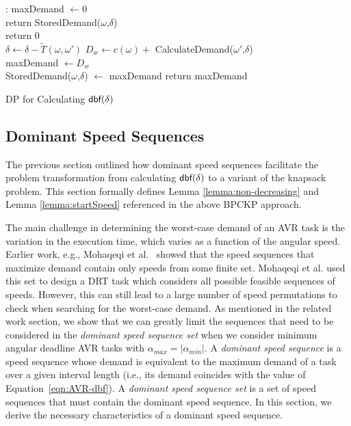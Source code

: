 \begin{algorithm}
\begin{algorithmic}[1]
:
\State maxDemand $\gets 0$
\\
\State return StoredDemand($\omega$,$\delta$)
\EndIf    
\\
\State return 0
\EndIf
\\
 
\State $\delta \gets \delta-\widetilde{T}(\omega,\omega')$
\State $D_w \gets c(\omega) +$ CalculateDemand($\omega'$,$\delta$)\\
\State maxDemand $\gets D_w$
\EndIf
\EndFor
\\
\State StoredDemand($\omega$,$\delta$) $\gets$ maxDemand
\State return maxDemand
\EndFunction
\end{algorithmic}
\caption{DP for Calculating $\mbox{\sf dbf}(\delta)$}
\label{algo}
\end{algorithm}

\subsection{Dominant Speed Sequences}
\label{sec:filterSeq}
The previous section outlined how dominant speed sequences facilitate the problem transformation from calculating $\mbox{\sf dbf}(\delta)$ to a variant of the knapsack problem.
This section formally defines Lemma \ref{lemma:non-decreasing} and Lemma \ref{lemma:startSpeed}
referenced in the above BPCKP approach.

The main challenge in determining the worst-case demand of an AVR task is the variation in the execution time, which varies as a function of the angular speed. 
Earlier work, e.g., Mohaqeqi et al.~\cite{mohaqeqi_refinement_2017} showed that the speed sequences that maximize demand contain only speeds from some finite set.
 Mohaqeqi et al. used this set to design a DRT task which considers all possible feasible sequences of speeds.
 However, this can still lead to a large number of speed permutations to check when searching for the worst-case demand.
 As mentioned in the related work section, we show that we can greatly limit the sequences that need to be considered in the \emph{dominant speed sequence set} when we consider minimum angular deadline AVR tasks with $\alpha_{max} = |\alpha_{min}|$.
  A \emph{dominant speed sequence} is  a speed sequence whose demand is equivalent to the maximum demand of a task over a given interval length (i.e., its demand coincides with the value of Equation~\ref{eqn:AVR-dbf}).
 A \textit{dominant speed sequence set} is a set of speed sequences that must contain the dominant speed sequence.
In this section, we derive the necessary characteristics of a dominant speed sequence.
\vspace{-1mm}
